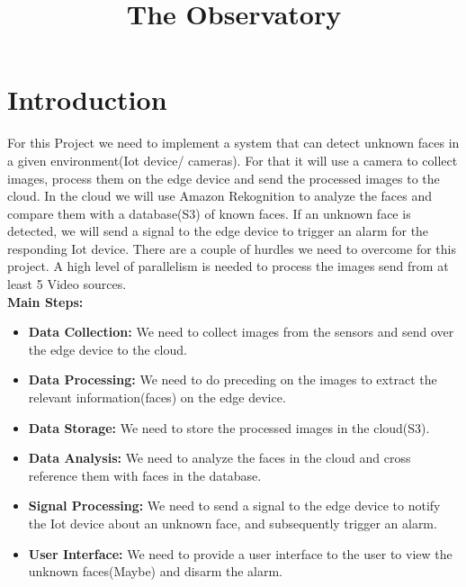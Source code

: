 \documentclass[conference]{IEEEtran}
\begin{document}
\title{The Observatory}

\author{
\and
{}
}

\maketitle

\section{Introduction}
For this Project we need to implement a system that can detect unknown faces in a given environment(Iot device/ cameras). For that it will
use a camera to collect images, process them on the edge device and send the processed images to the cloud. In the cloud
we will use Amazon Rekognition to analyze the faces and compare them with a database(S3) of known faces. If an unknown face
is detected, we will send a signal to the edge device to trigger an alarm for the responding Iot device.
There are a couple of hurdles we need to overcome for this project. A high level of parallelism is needed to process the images
send from at least 5 Video sources.
\\
\textbf{Main Steps:}
\begin{itemize}
    \item \textbf{Data Collection:} We need to collect images from the sensors and send over the edge device to the cloud.
    \item \textbf{Data Processing:} We need to do preceding on the images to extract the relevant information(faces) on the edge device.
    \item \textbf{Data Storage:} We need to store the processed images in the cloud(S3).
    \item \textbf{Data Analysis:} We need to analyze the faces in the cloud and cross reference them with faces in the database.
    \item \textbf{Signal Processing:} We need to send a signal to the edge device to notify the Iot device about an unknown face, and subsequently trigger an alarm.
    \item \textbf{User Interface:} We need to provide a user interface to the user to view the unknown faces(Maybe) and disarm the alarm.
\end{itemize}
\end{document}
